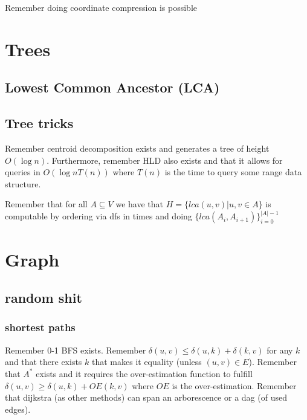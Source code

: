 \documentclass[landscape, 9pt, a4paper, oneside, twocolumn]{extarticle}
\begin{document}
	Remember doing coordinate compression is possible

\section{Trees}

	
	\subsection{Lowest Common Ancestor (LCA)}
	
	\subsection{Tree tricks}
	
	Remember centroid decomposition exists and generates a tree of height $O(\log n)$. Furthermore, remember HLD also exists and that it allows for queries in $O(\log n T(n))$ where $T(n)$ is the time to query some range data structure.
	
	Remember that for all $A\subseteq V$ we have that $H=\{lca(u,v)|u,v\in A\}$ is computable by ordering via dfs in times and doing $\{lca(A_i,A_{i+1})\}_{i=0}^{|A|-1}$

\section{Graph}
	\subsection{random shit}
	\subsubsection{shortest paths}
	Remember 0-1 BFS exists. Remember $\delta(u,v)\leq\delta(u,k)+\delta(k,v)$ for any $k$ and that there exists $k$ that makes it equality (unless $(u,v)\in E$). Remember that $A^*$ exists and it requires the over-estimation function to fulfill $\delta(u,v)\geq\delta(u,k)+OE(k,v)$ where $OE$ is the over-estimation. Remember that dijkstra (as other methods) can span an arborescence or a dag (of used edges).
\end{document}
